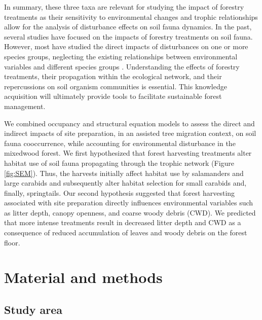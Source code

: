 In summary, these three taxa are relevant for studying the impact of forestry treatments as their sensitivity to environmental changes and trophic relationships allow for the analysis of disturbance effects on soil fauna dynamics. 
In the past, several studies have focused on the impacts of forestry treatments on soil fauna. 
However, most have studied the direct impacts of disturbances on one or more species groups, neglecting the existing relationships between environmental variables and different species groups \citep{josephIntegratingOccupancyModels2016,Kudrin2023metaanalysiseffects,Pollierer2021Diversityfunctional}. 
Understanding the effects of forestry treatments, their propagation within the ecological network, and their repercussions on soil organism communities is essential. 
This knowledge acquisition will ultimately provide tools to facilitate sustainable forest management.

We combined occupancy and structural equation models to assess the direct and indirect impacts of site preparation, in an assisted tree migration context, 
on soil fauna cooccurrence, while accounting for environmental disturbance in the mixedwood forest.
We first hypothesized that forest harvesting treatments alter habitat use of soil fauna propagating through the trophic network (Figure \ref*{fig:SEM}). 
Thus, the harvests initially affect habitat use by salamanders and large carabids and subsequently alter habitat selection for small carabids and, finally, springtails.
Our second hypothesis suggested that forest harvesting associated with site preparation directly influences environmental variables such as litter depth, canopy openness, and coarse woody debris (CWD). 
We predicted that more intense treatments result in decreased litter depth and CWD as a consequence of reduced accumulation of leaves and woody debris on the forest floor.

\section*{Material and methods}
\label{sec:matmet1}

\subsection*{Study area}
\label{subsec:area}

